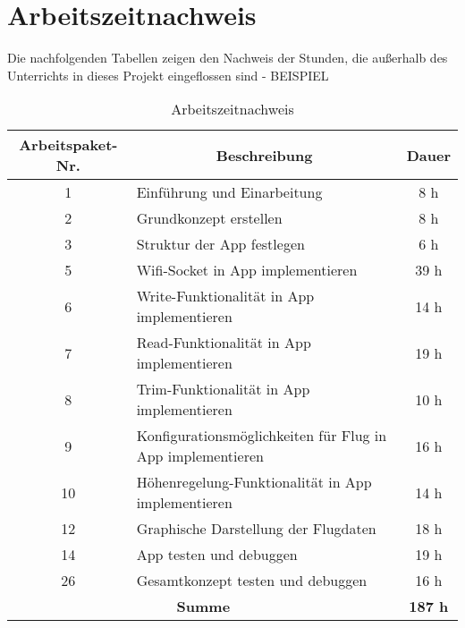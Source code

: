 
\section{Arbeitszeitnachweis}
Die nachfolgenden Tabellen zeigen den Nachweis der Stunden, die außerhalb des Unterrichts in dieses Projekt eingeflossen sind - BEISPIEL
\begin{table}[h!]
\centering
\begin{tabular}{|c|l|c|}
\hline
\multicolumn{1}{|c|}{\textbf{Arbeitspaket-Nr.}} &
\multicolumn{1}{c|}{\textbf{Beschreibung}}  &
\multicolumn{1}{c|}{\textbf{Dauer}}  \\ \hline
  1 & Einführung und Einarbeitung & 8 h \\ \hline
  2 & Grundkonzept erstellen & 8 h \\ \hline
  3 & Struktur der App festlegen & 6 h \\ \hline
  5 & Wifi-Socket in App implementieren & 39 h \\ \hline
  6 & Write-Funktionalität in App implementieren & 14 h \\ \hline
  7 & Read-Funktionalität in App implementieren & 19 h \\ \hline
  8 & Trim-Funktionalität in App implementieren & 10 h \\ \hline
  9 & Konfigurationsmöglichkeiten für Flug in App implementieren & 16 h \\ \hline
  10 & Höhenregelung-Funktionalität in App implementieren & 14 h \\ \hline
  12 & Graphische Darstellung der Flugdaten & 18 h \\ \hline
  14 & App testen und debuggen & 19 h \\ \hline
  26 & Gesamtkonzept testen und debuggen & 16 h \\ \hline
  \multicolumn{2}{|c|}{\textbf{Summe}} & \textbf{187 h} \\ \hline
 \end{tabular}
\caption{Arbeitszeitnachweis}
\end{table}

\newpage





